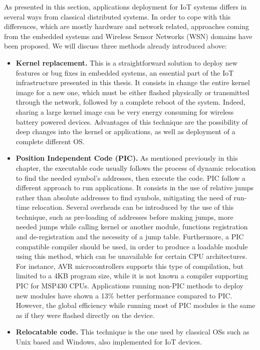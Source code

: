 As presented in this section, applications deployment for IoT systems differs in several ways from classical distributed systems.
In order to cope with this differences, which are mostly hardware and network related, approaches coming from the embedded systems and Wireless Sensor Networks (WSN) domains have been proposed.
We will discuss three methods already introduced above: 
\begin{itemize}
	\item \textbf{Kernel replacement.} This is a straightforward solution to deploy new features or bug fixes in embedded systems, an essential part of the IoT infrastructure presented in this thesis.
	It consists in change the entire kernel image for a new one, which must be either flashed physically or transmitted through the network, followed by a complete reboot of the system.
	Indeed, sharing a large kernel image can be very energy consuming for wireless battery powered devices.
	Advantages of this technique are the possibility of deep changes into the kernel or applications, as well as deployment of a complete different OS.
	\item \textbf{Position Independent Code (PIC).} As mentioned previously in this chapter, the executable code usually follows the process of dynamic relocation to find the needed symbol's addresses, then execute the code. 
	PIC follow a different approach to run applications. 
	It consists in the use of relative jumps rather than absolute addresses to find symbols, mitigating the need of run-time relocation.
	Several overheads can be introduced by the use of this technique, such as pre-loading of addresses before making jumps, more needed jumps while calling kernel or another module, functions registration and de-registration and the necessity of a jump table.
	Furthermore, a PIC compatible compiler should be used, in order to produce a loadable module using this method, which can be unavailable for certain CPU architectures.
	For instance, AVR microcontrollers supports this type of compilation, but limited to a 4KB program size, while it is not known a compiler supporting PIC for MSP430 CPUs.
	Applications running non-PIC methods to deploy new modules have shown a 13\% better performance compared to PIC\cite{dong2009dynamic}.
	However, the global efficiency while running most of PIC modules is the same as if they were flashed directly on the device.
	\item \textbf{Relocatable code.} This technique is the one used by classical OSs such as Unix based and Windows, also implemented for IoT devices\cite{dunkels06runtime}. 

\end{itemize}
